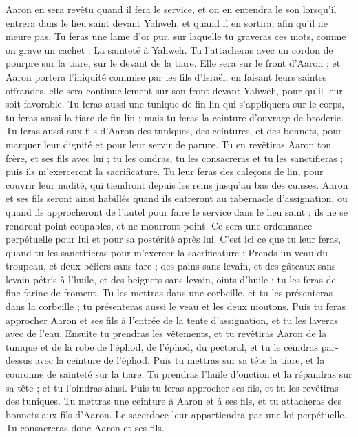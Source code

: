 \begin{multicols}{2}
Aaron en sera revêtu quand il fera le service, et on en entendra le son lorsqu'il entrera dans le lieu saint devant Yahweh, et quand il en sortira, afin qu'il ne meure pas.
Tu feras une lame d’or pur, sur laquelle tu graveras ces mots, comme on grave un cachet : La sainteté à Yahweh.
Tu l’attacheras avec un cordon de pourpre sur la tiare, sur le devant de la tiare.
Elle sera sur le front d'Aaron ; et Aaron portera l'iniquité commise par les fils d’Israël, en faisant leurs saintes offrandes, elle sera continuellement sur son front devant Yahweh, pour qu’il leur soit favorable.
Tu feras aussi une tunique de fin lin qui s'appliquera sur le corps, tu feras aussi la tiare de fin lin ; mais tu feras la ceinture d'ouvrage de broderie\FTNT{}.
Tu feras aussi aux fils d'Aaron des tuniques, des ceintures, et des bonnets, pour marquer leur dignité et pour leur servir de parure.
Tu en revêtiras Aaron ton frère, et ses fils avec lui ; tu les oindras, tu les consacreras et tu les sanctifieras ; puis ils m'exerceront la sacrificature\FTNT{}.
Tu leur feras des caleçons de lin, pour couvrir leur nudité, qui tiendront depuis les reins jusqu'au bas des cuisses.
Aaron et ses fils seront ainsi habillés quand ils entreront au tabernacle d'assignation, ou quand ils approcheront de l'autel pour faire le service dans le lieu saint ; ils ne se rendront point coupables, et ne mourront point. Ce sera une ordonnance perpétuelle pour lui et pour sa postérité après lui.
\VerseOne{}C'est ici ce que tu leur feras, quand tu les sanctifieras pour m'exercer la sacrificature : Prends un veau du troupeau, et deux béliers sans tare\FTNT{} ;
des pains sans levain, et des gâteaux sans levain pétris à l'huile, et des beignets sans levain, oints d'huile ; tu les feras de fine farine de froment\FTNT{}.
Tu les mettras dans une corbeille, et tu les présenteras dans la corbeille ; tu présenteras aussi le veau et les deux moutons.
Puis tu feras approcher Aaron et ses fils à l'entrée de la tente d'assignation, et tu les laveras avec de l'eau\FTNT{}.
Ensuite tu prendras les vêtements, et tu revêtiras Aaron de la tunique et de la robe de l'éphod, de l'éphod, du pectoral, et tu le ceindras par-dessus avec la ceinture de l'éphod.
Puis tu mettras sur sa tête la tiare, et la couronne de sainteté sur la tiare.
Tu prendras l'huile d'onction et la répandras sur sa tête ; et tu l'oindras ainsi.
Puis tu feras approcher ses fils, et tu les revêtiras des tuniques.
Tu mettras une ceinture à Aaron et à ses fils\FTNT{}, et tu attacheras des bonnets aux fils d’Aaron. Le sacerdoce leur appartiendra par une loi perpétuelle. Tu consacreras donc Aaron et ses fils.

\end{multicols}
